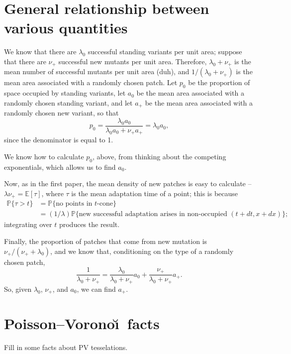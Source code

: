 \documentclass{article}
\renewcommand{\P}{\mathbb{P}}
\newcommand{\E}{\mathbb{E}}
\begin{document}
\section{General relationship between various quantities}

We know that there are $\lambda_0$ successful standing variants per unit area;
suppose that there are $\nu_+$ successful new mutants per unit area.
Therefore, $\lambda_0+\nu_+$ is the mean number of successful mutants per unit area (duh),
and $1/(\lambda_0+\nu_+)$ is the mean area associated with a randomly chosen patch.
Let $p_0$ be the proportion of space occupied by standing variants, 
let $a_0$ be the mean area associated with a randomly chosen standing variant,
and let $a_+$ be the mean area associated with a randomly chosen new variant,
so that
\[
    p_0 = \frac{ \lambda_0 a_0 }{ \lambda_0 a_0 + \nu_+ a_+ } = \lambda_0 a_0 ,
\]
since the denominator is equal to 1.

We know how to calculate $p_0$, above, from thinking about the competing exponentials,
which allows us to find $a_0$.

Now, as in the first paper, the mean density of new patches is easy to calculate -- 
$\lambda \nu_+ = \E[\tau]$, where $\tau$ is the mean adaptation time of a point;
this is because 
\begin{align*}
    \P\{ \tau > t \} &= \P\{ \mbox{no points in $t$-cone} \} \\
            &= (1/\lambda) \P\{ \mbox{new successful adaptation arises in non-occupied $(t+dt,x+dx)$} \} ;
\end{align*}
integrating over $t$ produces the result.

Finally, the proportion of patches that come from new mutation is $\nu_+ / (\nu_+ + \lambda_0)$,
and we know that, conditioning on the type of a randomly chosen patch,
\[
    \frac{1}{\lambda_0+\nu_+} = \frac{\lambda_0}{\lambda_0+\nu_+} a_0 + \frac{\nu_+}{\lambda_0+\nu_+} a_+ .
\]
So, given $\lambda_0$, $\nu_+$, and $a_0$, we can find $a_+$.


\section{Poisson--Vorono\u\i\ facts}

Fill in some facts about PV tesselations.
\end{document}

